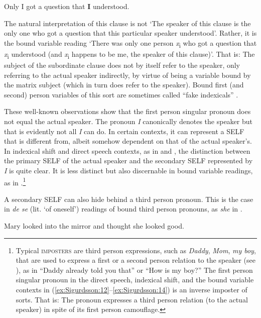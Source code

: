 \documentclass[output=paper]{LSP/langsci}
\begin{document}
\ea%
    \label{ex:Sigurdsson:14}
	  Only I got a question that \textbf{I} understood.
\z

The natural interpretation of this clause is not ‘The speaker of this clause is the only one who got a question that this particular speaker understood’. Rather, it is the bound variable reading ‘There was only one person \textit{x}\textsubscript{i} who got a question that \textit{x}\textsubscript{i} understood (and \textit{x}\textsubscript{i} happens to be me, the speaker of this clause)’. That is: The subject of the subordinate clause does not by itself refer to the speaker, only referring to the actual speaker indirectly, by virtue of being a variable bound by the matrix subject (which in turn does refer to the speaker). Bound first (and second) person variables of this sort are sometimes called ``fake indexicals'' \citep{Kratzer2009}.

  These well-known observations show that the first person singular pronoun does not equal the actual speaker. The pronoun \textit{I} canonically denotes the speaker but that is evidently not all \textit{I} can do. In certain contexts, it can represent a SELF that is different from, albeit somehow dependent on that of the actual speaker’s. In indexical shift and direct speech contexts, as in  and , the distinction between the primary SELF of the actual speaker and the secondary SELF represented by \textit{I} is quite clear. It is less distinct but also discernable in bound variable readings, as in .\footnote{Typical \textsc{imposters} are third person expressions, such as \textit{Daddy}, \textit{Mom}, \textit{my boy}, that are used to express a first or a second person relation to the speaker (see \citealt{CollinsPostal2012,WoodSigurðsson2011}), as in “Daddy already told you that” or “How is my boy?” The first person singular pronoun in the direct speech, indexical shift, and the bound variable contexts in (\ref{ex:Sigurdsson:12}–\ref{ex:Sigurdsson:14}) is an inverse imposter of sorts. That is: The pronoun expresses a third person relation (to the actual speaker) in spite of its first person camouflage.}

  A secondary SELF can also hide behind a third person pronoun. This is the case in \textit{de se} (lit. ‘of oneself’)  readings of bound third person pronouns, as \textit{she} in .

\ea%
    \label{ex:Sigurdsson:15}
   Mary looked into the mirror and thought she looked good.
\z
\end{document}
